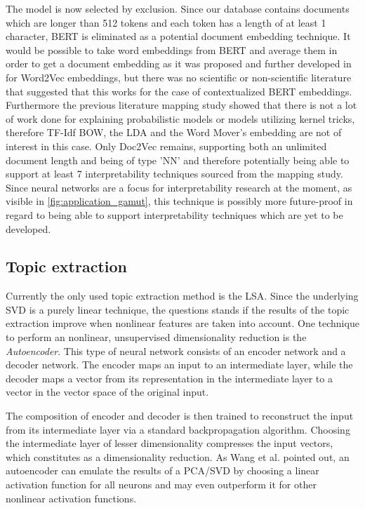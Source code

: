 The model is now selected by exclusion. Since our database contains documents which are longer than 512 tokens and each token has a length of at least 1 character, BERT is eliminated as a potential document embedding technique. It would be possible to take word embeddings from BERT and average them in order to get a document embedding as it was proposed and further developed in \cite{deboomRepresentationLearningVery2016} for Word2Vec embeddings, but there was no scientific or non-scientific literature that suggested that this works for the case of contextualized BERT embeddings.
Furthermore the previous literature mapping study showed that there is not a lot of work done for explaining probabilistic models or models utilizing kernel tricks, therefore TF-Idf BOW, the LDA and the Word Mover's embedding are not of interest in this case. Only Doc2Vec remains, supporting both an unlimited document length and being of type 'NN' and therefore potentially being able to support at least 7 interpretability techniques sourced from the mapping study. Since neural networks are a focus for interpretability research at the moment, as visible in \autoref{fig:application_gamut}, this technique is possibly more future-proof in regard to being able to support interpretability techniques which are yet to be developed.

\subsection{Topic extraction}

Currently the only used topic extraction method is the LSA. Since the underlying SVD is a purely linear technique, the questions stands if the results of the topic extraction improve when nonlinear features are taken into account. One technique to perform an nonlinear, unsupervised dimensionality reduction is the \textit{Autoencoder}. This type of neural network consists of an encoder network and a decoder network. The encoder maps an input to an intermediate layer, while the decoder maps a vector from its representation in the intermediate layer to a vector in the vector space of the original input.

The composition of encoder and decoder is then trained to reconstruct the input from its intermediate layer via a standard backpropagation algorithm. Choosing the intermediate layer of lesser dimensionality compresses the input vectors, which constitutes as a dimensionality reduction. As Wang et al. \cite{wangAutoencoderBasedDimensionality2016} pointed out, an autoencoder can emulate the results of a PCA/SVD by choosing a linear activation function for all neurons and may even outperform it for other nonlinear activation functions.

